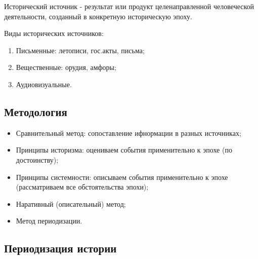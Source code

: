 
\begin{definition}
  Исторический источник - результат или продукт целенаправленной человеческой деятельности, созданный в конкретную историческую эпоху.
\end{definition}

Виды исторических источников:
\begin{enumerate}
  \item Письменные: летописи, гос.акты, письма;
  \item Вещественные: орудия, амфоры;
  \item Аудиовизуальные.
\end{enumerate}

\subsection*{Методология}
\begin{itemize}
  \item Сравнительный метод: сопоставление ифнормации в разных источниках;
  \item Принципы историзма: оцениваем события применительно к эпохе (по достоинству);
  \item Принципы системности: описываем события применительно к эпохе (рассматриваем все обстоятельства эпохи);
  \item Наративный (описательный) метод;
  \item Метод периодизации.
\end{itemize}

\subsection*{Периодизация истории}

